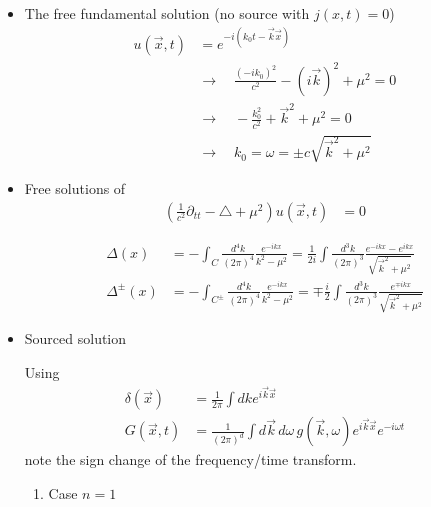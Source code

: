 \documentclass[10pt,a4paper]{book}
\theoremstyle{definition}
\begin{document}
\begin{itemize}
\item The free fundamental solution (no source with $j(x,t)=0$)
\begin{align}
u(\vec{x},t)&=e^{-i(k_0t-\vec{k}\vec{x})}\\
&\rightarrow\quad \frac{(-ik_0)^2}{c^2}-(i\vec{k})^2+\mu^2=0\\
&\rightarrow\quad -\frac{k_0^2}{c^2}+\vec{k}^2+\mu^2=0\\
&\rightarrow\quad k_0=\omega=\pm c\sqrt{\vec{k}^2+\mu^2}
\end{align}

\item Free solutions of
\begin{align}
\left(\frac{1}{c^2}\partial_{tt}-\triangle+\mu^2\right) u(\vec{x},t)&=0
\end{align}

\begin{align}
\varDelta(x)
&=-\int_C\frac{d^4k}{(2\pi)^4}\frac{e^{-ikx}}{k^2-\mu^2}=\frac{1}{2i}\int\frac{d^3k}{(2\pi)^3}\frac{e^{-ikx}-e^{ikx}}{\sqrt{\vec{k}^2+\mu^2}}\\
\varDelta^\pm(x)
&=-\int_{C^\pm}\frac{d^4k}{(2\pi)^4}\frac{e^{-ikx}}{k^2-\mu^2}=\mp\frac{i}{2}\int\frac{d^3k}{(2\pi)^3}\frac{e^{\mp ikx}}{\sqrt{\vec{k}^2+\mu^2}}
\end{align}

\item Sourced solution

Using
\begin{align}
\delta(\vec{x})&=\frac{1}{2\pi}\int dk e^{i\vec{k}\vec{x}}\\
G(\vec{x},t)&=\frac{1}{(2\pi)^d}\int d\vec{k}\,d\omega\,g(\vec{k},\omega)e^{i\vec{k}\vec{x}}e^{-i\omega t}
\end{align}
note the sign change of the frequency/time transform.

\begin{enumerate}
\item Case $n=1$


\end{enumerate}
\end{itemize}
\end{document}
